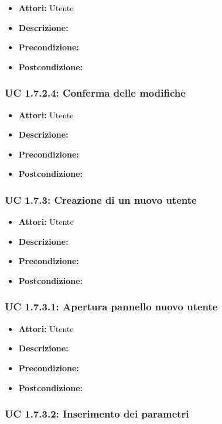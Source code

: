 \begin{itemize}
\item \textbf{Attori:} Utente
\item \textbf{Descrizione:} 
\item \textbf{Precondizione:} 
\item \textbf{Postcondizione:} 
\end{itemize}

\subsubsection{UC 1.7.2.4: Conferma delle modifiche}

\begin{itemize}
\item \textbf{Attori:} Utente
\item \textbf{Descrizione:} 
\item \textbf{Precondizione:} 
\item \textbf{Postcondizione:} 
\end{itemize}

\subsubsection{UC 1.7.3: Creazione di un nuovo utente}

\begin{itemize}
\item \textbf{Attori:} Utente
\item \textbf{Descrizione:} 
\item \textbf{Precondizione:} 
\item \textbf{Postcondizione:} 
\end{itemize}

\subsubsection{UC 1.7.3.1: Apertura pannello nuovo utente}

\begin{itemize}
\item \textbf{Attori:} Utente
\item \textbf{Descrizione:} 
\item \textbf{Precondizione:} 
\item \textbf{Postcondizione:} 
\end{itemize}

\subsubsection{UC 1.7.3.2: Inserimento dei parametri}

